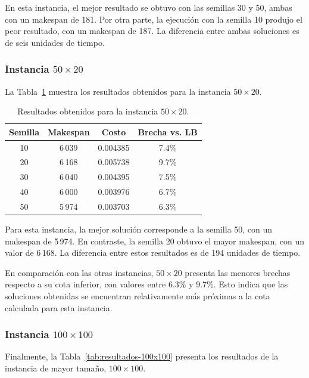 \documentclass[12pt,a4paper]{article}
\begin{document}
En esta instancia, el mejor resultado se obtuvo con las semillas 30 y 50, ambas con un makespan de 181. Por otra parte, la ejecución con la semilla 10 produjo el peor resultado, con un makespan de 187. La diferencia entre ambas soluciones es de seis unidades de tiempo.

\subsubsection{Instancia $50 \times 20$}

La Tabla~\ref{tab:resultados-50x20} muestra los resultados obtenidos para la instancia $50 \times 20$.

\begin{table}[H]
    \centering
    \caption{Resultados obtenidos para la instancia $50 \times 20$.}
    \label{tab:resultados-50x20}
    \begin{tabular}{cccc}
        \hline
        \textbf{Semilla} & \textbf{Makespan} & \textbf{Costo} & \textbf{Brecha vs. LB} \\
        \hline
        10 & 6\,039 & 0.004385 & 7.4\% \\
        20 & 6\,168 & 0.005738 & 9.7\% \\
        30 & 6\,040 & 0.004395 & 7.5\% \\
        40 & 6\,000 & 0.003976 & 6.7\% \\
        50 & 5\,974 & 0.003703 & 6.3\% \\
        \hline
    \end{tabular}
\end{table}

Para esta instancia, la mejor solución corresponde a la semilla 50, con un makespan de 5\,974. En contraste, la semilla 20 obtuvo el mayor makespan, con un valor de 6\,168. La diferencia entre estos resultados es de 194 unidades de tiempo.

En comparación con las otras instancias, $50 \times 20$ presenta las menores brechas respecto a su cota inferior, con valores entre 6.3\% y 9.7\%. Esto indica que las soluciones obtenidas se encuentran relativamente más próximas a la cota calculada para esta instancia.

\subsubsection{Instancia $100 \times 100$}

Finalmente, la Tabla~\ref{tab:resultados-100x100} presenta los resultados de la instancia de mayor tamaño, $100 \times 100$.
\end{document}
